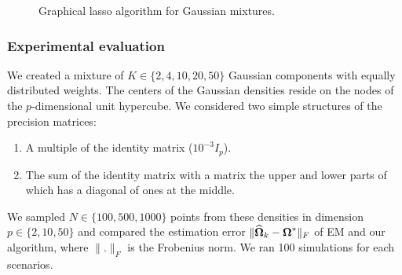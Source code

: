 \begin{figure}
\begin{center}
   \caption{Graphical lasso algorithm for Gaussian mixtures.}
   \label{algo:graph_lasso_EM}
\end{center}
\end{figure}

\subsubsection{Experimental evaluation}
We created a mixture of $K\in\{2,4,10,20,50\}$ Gaussian components with equally distributed weights. The centers of the Gaussian densities reside on the nodes of the $p$-dimensional unit hypercube. We considered two simple structures of the precision matrices: 
\begin{enumerate}
  \item A multiple of the identity matrix ($10^{-3}I_p$).
  \item The sum of the identity matrix with a matrix the upper and lower parts of which has a diagonal of ones at the middle.
\end{enumerate}
We sampled $N\in\{100, 500, 1000\}$ points from these densities in dimension $p\in\{2, 10, 50\}$ and compared the estimation error $\|\widehat{\boldsymbol\Omega}_k-\boldsymbol\Omega^*\|_F$ of EM and our algorithm, where $\|.\|_F$ is the Frobenius norm. We ran 100 simulations for each scenarios. 

